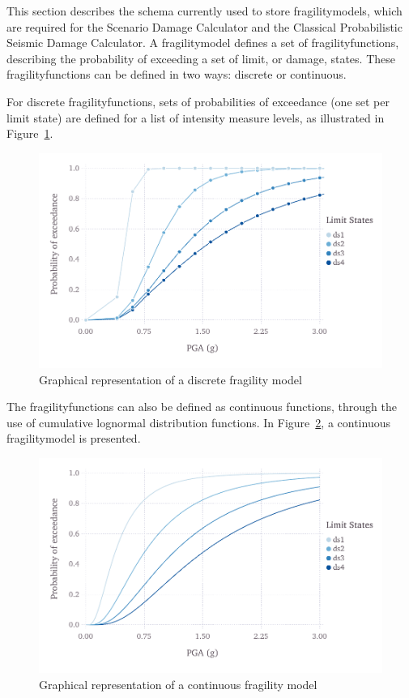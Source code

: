This section describes the schema currently used to store
\glspl{fragilitymodel}, which are required for the Scenario Damage Calculator
and the Classical Probabilistic Seismic Damage Calculator. A
\gls{fragilitymodel} defines a set of \glspl{fragilityfunction}, describing
the probability of exceeding a set of limit, or damage, states. These
\glspl{fragilityfunction} can be defined in two ways: discrete or continuous.

For discrete \glspl{fragilityfunction}, sets of probabilities of exceedance
(one set per limit state) are defined for a list of intensity measure levels,
as illustrated in Figure~\ref{fig:fragility-discrete}.

\begin{figure}[ht]
\centering
\includegraphics[width=12cm]{figures/risk/fragility-discrete.pdf}
\caption{Graphical representation of a discrete fragility model}
\label{fig:fragility-discrete}
\end{figure}

The \glspl{fragilityfunction} can also be defined as continuous functions,
through the use of cumulative lognormal distribution functions. In
Figure~\ref{fig:fragility-continuous}, a continuous \gls{fragilitymodel} is
presented.

\begin{figure}[ht]
\centering
\includegraphics[width=12cm]{figures/risk/fragility-continuous.pdf}
\caption{Graphical representation of a continuous fragility model}
\label{fig:fragility-continuous}
\end{figure}

